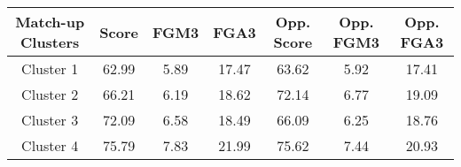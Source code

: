\begin{tabular}{|c||c|c|c|c|c|c|} 
\hline
\textbf{Match-up Clusters} & Score & FGM3 & FGA3 & Opp. Score & Opp. FGM3 & Opp. FGA3 \\ 
\hline
\hline
Cluster 1 & 62.99 & 5.89 & 17.47 & 63.62 & 5.92 & 17.41 \\ 
\hline
Cluster 2 & 66.21 & 6.19 & 18.62 & 72.14 & 6.77 & 19.09 \\
\hline
Cluster 3 & 72.09 & 6.58 & 18.49 & 66.09 & 6.25 & 18.76 \\
\hline
Cluster 4 & 75.79 & 7.83 & 21.99 & 75.62 & 7.44 & 20.93 \\
\hline
\end{tabular}